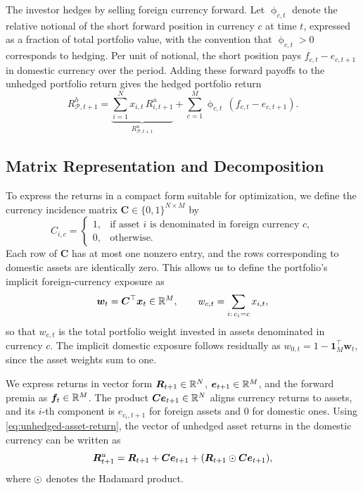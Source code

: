 The investor hedges by selling foreign currency forward. Let $\upphi_{c,t}$ denote the relative notional of the short forward position in currency $c$ at time $t$, expressed as a fraction of total portfolio value, with the convention that $\upphi_{c,t}>0$ corresponds to hedging. Per unit of notional, the short position pays $f_{c,t}-e_{c,t+1}$ in domestic currency over the period. Adding these forward payoffs to the unhedged portfolio return gives the hedged portfolio return
\begin{equation}
R^{h}_{\mathcal{P},t+1}
=
\underbrace{\sum_{i=1}^N x_{i,t}\,R^{u}_{i,t+1}}_{R^{u}_{\mathcal{P},t+1}}
+
\sum_{c=1}^M \upphi_{c,t}\,(f_{c,t}-e_{c,t+1}).
\label{eq:hedged-portfolio-return}
\end{equation}

\subsection{Matrix Representation and Decomposition}\label{sec:matrix-representation}

To express the returns in a compact form suitable for optimization, we define the currency incidence matrix $\bm{C}\in\{0,1\}^{N\times M}$ by
\begin{equation*}
C_{i,c} =
\begin{cases}
1, & \text{if asset $i$ is denominated in foreign currency $c$},\\
0, & \text{otherwise}.
\end{cases}
\end{equation*}
Each row of $\bm{C}$ has at most one nonzero entry, and the rows corresponding to domestic assets are identically zero. This allows us to define the portfolio's implicit foreign-currency exposure as
\begin{equation*}
\bm{w}_t = \bm{C}^\top \bm{x}_t \in \mathbb{R}^M,
\qquad
w_{c,t} = \sum_{i:\,c_i=c} x_{i,t},
\end{equation*}
so that $w_{c,t}$ is the total portfolio weight invested in assets denominated in currency $c$. The implicit domestic exposure follows residually as $w_{0,t} = 1 - \bm{1}_M^\top \bm{w}_t$, since the asset weights sum to one.

We express returns in vector form $\bm{R}_{t+1} \in \mathbb{R}^N$, $\bm{e}_{t+1} \in \mathbb{R}^M$, and the forward premia as $\bm{f}_t \in \mathbb{R}^M$. The product $\bm{C}\bm{e}_{t+1}\in\mathbb{R}^N$ aligns currency returns to assets, and its $i$-th component is $e_{c_i,t+1}$ for foreign assets and $0$ for domestic ones. Using \eqref{eq:unhedged-asset-return}, the vector of unhedged asset returns in the domestic currency can be written as
\begin{equation*}
\bm{R}^{u}_{t+1}
=
\bm{R}_{t+1}
+
\bm{C}\bm{e}_{t+1}
+
(\bm{R}_{t+1}\odot\bm{C}\bm{e}_{t+1}),
\end{equation*}
where $\odot$ denotes the Hadamard product. 

